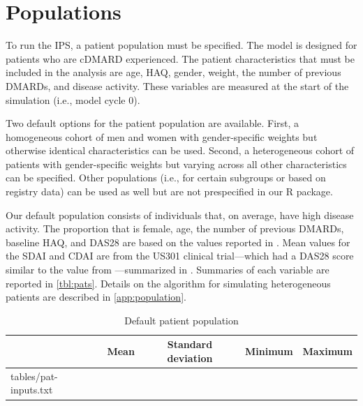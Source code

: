 \documentclass[11pt,final,fleqn]{article}\usepackage[]{graphicx}\usepackage[]{color}
\makeatletter
\theoremstyle{plain}
\newcommand*\ExpandableInput[1]{\@@input#1 }
\newcommand\R{{\textsf{R}}}
\makeatother
\begin{document}
\section{Populations}\label{sec:populations}
To run the IPS, a patient population must be specified. The model is designed for patients who are cDMARD experienced. The patient characteristics that must be included in the analysis are age, HAQ, gender, weight, the number of previous DMARDs, and disease activity. These variables are measured at the start of the simulation (i.e., model cycle 0).  

Two default options for the patient population are available. First, a homogeneous cohort of men and women with gender-specific weights but otherwise identical characteristics can be used. Second, a heterogeneous cohort of patients with gender-specific weights but varying across all other characteristics can be specified. Other populations (i.e., for certain subgroups or based on registry data) can be used as well but are not prespecified in our \R{} package. 



Our default population consists of individuals that, on average, have high disease activity. The proportion that is female, age, the number of previous DMARDs, baseline HAQ, and DAS28 are based on the values reported in \citet{curtis2010comparison}. Mean values for the SDAI and CDAI are from the US301 clinical trial---which had a DAS28 score similar to the value from \citet{curtis2010comparison}---summarized in \citet{smolen2003simplified}. Summaries of each variable are reported in \autoref{tbl:pats}. Details on the algorithm for simulating heterogeneous patients are described in \autoref{app:population}.

\begin{table}[!ht]
\begin{center}
\begin{threeparttable}
\caption{Default patient population} \label{tbl:pats}
\begin{tabularx}{\textwidth}{@{\extracolsep{\fill}}lcccc}
\hline
\multicolumn{1}{l}{} & \multicolumn{1}{c}{Mean} & \multicolumn{1}{c}{Standard deviation} & \multicolumn{1}{c}{Minimum} & \multicolumn{1}{c}{Maximum}\\
\hline
\ExpandableInput{tables/pat-inputs.txt}
\hline
\end{tabularx}
\scriptsize
\end{threeparttable}
\end{center}
\end{table}
\end{document}
